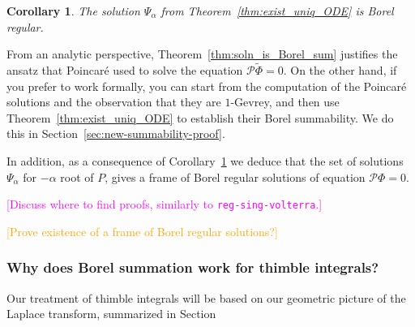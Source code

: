 \documentclass{article}
\newcommand{\C}{\mathbb{C}}
\newcommand{\series}[1]{\tilde{#1}}
\theoremstyle{definition}
\theoremstyle{plain}
\newtheorem{corollary}[theorem]{Corollary}
\begin{document}
\begin{corollary}\label{cor:soln_borel-reg}
The solution $\Psi_\alpha$ from Theorem~\ref{thm:exist_uniq_ODE} is Borel regular.
\end{corollary}
From an analytic perspective, Theorem~\ref{thm:soln_is_Borel_sum} justifies the ansatz that Poincar\'{e} used to solve the equation $\mathcal{P}\series{\Phi} = 0$. On the other hand, if you prefer to work formally, you can start from the computation of the Poincar\'{e} solutions and the observation that they are $1$-Gevrey, and then use Theorem~\ref{thm:exist_uniq_ODE} to establish their Borel summability. We do this in Section~\ref{sec:new-summability-proof}.

In addition, as a consequence of Corollary~\ref{cor:soln_borel-reg} we deduce that the set of solutions $\Psi_\alpha$ for $-\alpha$ root of $P$, gives a frame of Borel regular solutions of equation $\mathcal{P}\Phi=0$.  

\textcolor{magenta}{[Discuss where to find proofs, similarly to \texttt{reg-sing-volterra}.]}

\textcolor{orange}{[Prove existence of a frame of Borel regular solutions?]}
\color{black}
\subsubsection{Why does Borel summation work for thimble integrals?}\label{sec:why_borel_thimble}
Our treatment of thimble integrals will be based on our geometric picture of the Laplace transform, summarized in Section~
\end{document}
